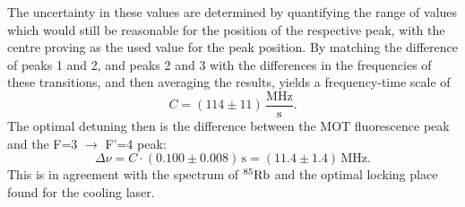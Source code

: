 \documentclass[twocolumn]{article}
\begin{document}
The uncertainty in these values are determined by quantifying the range of values which would still be reasonable for the position of the respective peak, with the centre proving as the used value for the peak position. By matching the difference of peaks 1 and 2, and peaks 2 and 3 with the differences in the frequencies of these transitions, and then averaging the results, yields a frequency-time scale of
\begin{equation}
C =(114 \pm 11)\, \frac{\text{MHz}}{\text{s}}. \nonumber
\end{equation}
The optimal detuning then is the difference between the MOT fluorescence peak and the F=3 $\rightarrow$ F'=4 peak:
\begin{equation}\label{eqn:detuning}
\Delta \nu = C \cdot (0.100 \pm 0.008) \, \text{s} = (11.4 \pm 1.4) \, \text{MHz}.
\end{equation}
This is in agreement with the spectrum of $^{85}\ce{Rb}$ and the optimal locking place found for the cooling laser. \\
\end{document}
